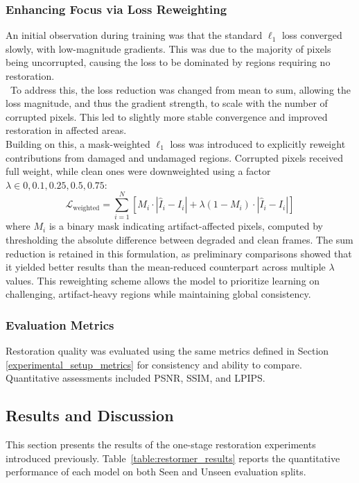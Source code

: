 \documentclass[10pt,a4paper,twocolumn,twoside]{article}
\begin{document}
\subsubsection{Enhancing Focus via Loss Reweighting}
An initial observation during training was that the standard $\ell_1$ loss converged slowly, with low-magnitude gradients. This was due to the majority of pixels being uncorrupted, causing the loss to be dominated by regions requiring no restoration. \\\ To address this, the loss reduction was changed from mean to sum, allowing the loss magnitude, and thus the gradient strength, to scale with the number of corrupted pixels. This led to slightly more stable convergence and improved restoration in affected areas. \\ Building on this, a mask-weighted $\ell_1$ loss was introduced to explicitly reweight contributions from damaged and undamaged regions. Corrupted pixels received full weight, while clean ones were downweighted using a factor $\lambda \in {0, 0.1, 0.25, 0.5, 0.75}$:
\begin{equation*}
\mathcal{L}_{\text{weighted}} = \sum_{i=1}^N \left[ M_i \cdot |\hat{I}_i - I_i| + \lambda (1 - M_i) \cdot |\hat{I}_i - I_i| \right]
\end{equation*}
where $M_i$ is a binary mask indicating artifact-affected pixels, computed by thresholding the absolute difference between degraded and clean frames. The sum reduction is retained in this formulation, as preliminary comparisons showed that it yielded better results than the mean-reduced counterpart across multiple $\lambda$ values. This reweighting scheme allows the model to prioritize learning on challenging, artifact-heavy regions while maintaining global consistency.
\subsubsection{Evaluation Metrics}
Restoration quality was evaluated using the same metrics defined in Section \ref{experimental_setup_metrics} for consistency and ability to compare. Quantitative assessments included PSNR, SSIM, and LPIPS. 

\subsection{Results and Discussion}

This section presents the results of the one-stage restoration experiments introduced previously. Table~\ref{table:restormer_results} reports the quantitative performance of each model on both Seen and Unseen evaluation splits.
\end{document}
